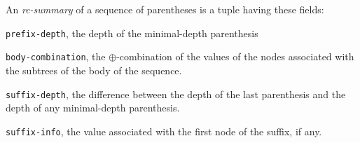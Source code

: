 \documentclass[a4paper,USenglish]{lipics}
\newcommand{\var}[1]{\textrm{\texttt{#1}}}
\begin{document}
			\begin{definition}[rc-summary]
				An \emph{rc-summary} of a sequence of parentheses is a tuple having these fields:
				\begin{compactitem}
					\item {\var{prefix-depth}}, the depth of the minimal-depth parenthesis
					\item {\var{body-combination}}, the $\oplus$-combination of the values of the nodes associated with the subtrees of the body of the sequence.
					\item {\var{suffix-depth}}, the difference between the depth of the last parenthesis and the depth of any minimal-depth parenthesis.
					\item {\var{suffix-info}}, the value associated with the first node of the suffix, if any.
				\end{compactitem}
			\end{definition}
\end{document}
